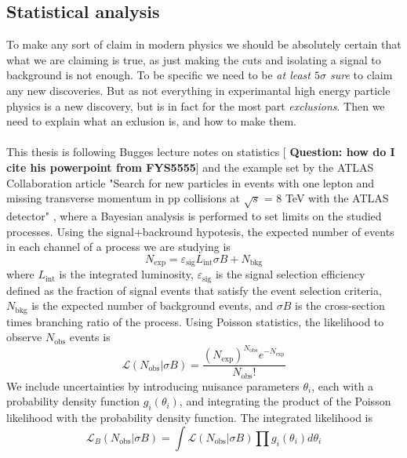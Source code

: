 \documentclass[12pt, a4paper]{book}
\begin{document}
\subsection{Statistical analysis}\label{sec:stat_anal}
To make any sort of claim in modern physics we should be absolutely certain that what we are claiming is true, as just making the cuts and isolating a signal to background is not enough. To be specific we need to be \textit{at least $5\sigma$ sure} to claim any new discoveries. 
But as not everything in experimantal high energy particle physics is a new discovery, but is in fact for the most part \textit{exclusions}. Then we need to explain what an exlusion is, and how to make them. \\ 
\\This thesis is following Bugges lecture notes on statistics [\textbf{ Question: how do I cite his powerpoint from FYS5555}] and the example set by the ATLAS Collaboration article "Search for new particles in events with one lepton and missing transverse momentum in pp collisions at $\sqrt s$ = 8 TeV with the ATLAS detector" \cite{Stat},
where a Bayesian analysis is performed to set limits on the studied processes. Using the signal+backround hypotesis, the expected number of events in each channel of a process we are studying is 
$$
    N_{\text{exp}} = \varepsilon_{\text{sig}}L_{\text{int}}\sigma B + N_{\text{bkg}}
$$
where $L_{\text{int}}$ is the integrated luminosity, $\varepsilon_{\text{sig}}$ is the signal selection efficiency defined as the fraction of signal events that satisfy the event selection criteria, $N_{\text{bkg}}$ is the expected number of background events, and $\sigma B$ is the 
cross-section times branching ratio of the process. Using Poisson statistics, the likelihood to observe $N_{\text{obs}}$ events is
\begin{equation}\label{eq:observed_events_prob}
    \mathcal{L}(N_{\text{obs}}\vert \sigma B) = \frac{(N_{\text{exp}})^{N_{\text{obs}}}e^{-N_{\text{exp}}}}{N_{\text{obs}}!}
\end{equation}
We include uncertainties by introducing nuisance parameters $\theta_i$, each with a probability density function $g_i(\theta_i)$, and integrating the product of the Poisson likelihood with the probability density function. The integrated likelihood is
\begin{equation}\label{eq:observed_events_nuisance}
    \mathcal{L}_B(N_{\text{obs}}\vert \sigma B)=\int\mathcal{L}(N_{\text{obs}}\vert \sigma B)\prod g_i(\theta_i)d\theta_i
\end{equation}
\end{document}
